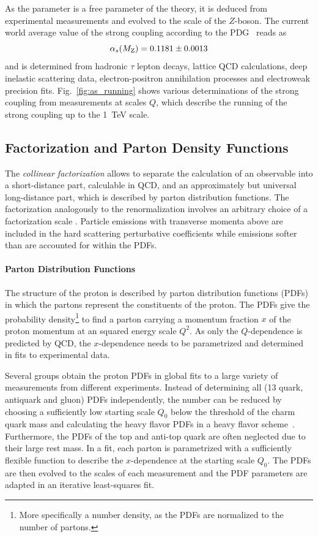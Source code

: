 As the parameter \as is a free parameter of the theory, it is deduced from
experimental measurements and evolved to the scale of the $Z$-boson. The current
world average value of the strong coupling according to the
PDG~\cite{Agashe:2014kda} reads as
%
\begin{equation*}
    \alpha_{s}(M_\mathrm{Z}) = 0.1181 \pm 0.0013
\end{equation*}
%
and is determined from hadronic $\tau$ lepton decays, lattice QCD calculations,
deep inelastic scattering data, electron-positron annihilation processes and
electroweak precision fits. Fig.~\ref{fig:as_running} shows various
determinations of the strong coupling from measurements at scales $Q$,
which describe the running of the strong coupling up to the \SI{1}{\TeV} scale.

\subsection{Factorization and Parton Density Functions}
\label{sec:factorization}

The \emph{collinear factorization} allows to separate the
calculation of an observable into a short-distance part, calculable in QCD, and
an approximately but universal long-distance part, which is described by parton
distribution functions. The factorization analogously to the renormalization
involves an arbitrary choice of a factorization scale \muf. Particle emissions
with transverse momenta above \muf are included in the hard scattering
perturbative coefficients while emissions softer than \muf are accounted for
within the PDFs.

\paragraph{Parton Distribution Functions}

The structure of the proton is described by parton distribution functions (PDFs)
in which the partons represent the constituents of the proton. The PDFs give
the probability density\footnote{More specifically a number density, as the PDFs are
normalized to the number of partons.} to find a parton carrying a momentum
fraction $x$ of the proton momentum at an squared energy scale $Q^2$. As only
the $Q$-dependence is predicted by QCD, the $x$-dependence needs to be
parametrized and determined in fits to experimental data.

Several groups obtain the proton PDFs in global fits to a large variety of
measurements from different experiments. Instead of determining all (13 quark,
antiquark and gluon) PDFs independently, the number can be reduced by choosing a
sufficiently low starting scale $Q_0$ below the threshold of the charm quark
mass and calculating the heavy flavor PDFs in a heavy flavor
scheme~\cite{Thorne:2006qt}. Furthermore, the PDFs of the top and anti-top quark
are often neglected due to their large rest mass. In a fit, each parton is
parametrized with a sufficiently flexible function to describe the
$x$-dependence at the starting scale $Q_0$. The PDFs are then evolved to the 
scales of each measurement and the PDF parameters are adapted in an iterative
least-squares fit.

